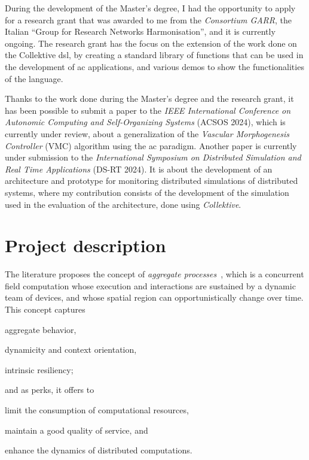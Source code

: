 \documentclass[12pt, a4paper]{article}
\newenvironment{inlinelist}{\begin{enumerate*}[label=\emph{(\roman*)}]}{\end{enumerate*}}
\begin{document}
During the development of the Master's degree,
I had the opportunity to apply for a research grant that was awarded to me from the \emph{Consortium GARR},
the Italian ``Group for Research Networks Harmonisation'',
and it is currently ongoing.
%
The research grant has the focus on the extension of the work done on the Collektive \ac{dsl},
by creating a standard library of functions that can be used in the development of \ac{ac} applications,
and various demos to show the functionalities of the language.

Thanks to the work done during the Master's degree and the research grant,
it has been possible to submit a paper to the \emph{IEEE International Conference on Autonomic Computing and Self-Organizing Systems} (ACSOS 2024),
which is currently under review,
about a generalization of the \emph{Vascular Morphogenesis Controller} (VMC) algorithm using the \ac{ac} paradigm.
%
Another paper is currently under submission to the \emph{International Symposium on Distributed Simulation and Real Time Applications} (DS-RT 2024).
%
It is about the development of an architecture and prototype for monitoring distributed simulations of distributed systems,
where my contribution consists of the development of the simulation used in the evaluation of the architecture,
done using \emph{Collektive}.


\section{Project description}\label{sec:project-description}
The literature proposes the concept of \emph{aggregate processes}~\cite{aggregate-processes},
which is a concurrent field computation whose execution and interactions are sustained by a dynamic team of devices,
and whose spatial region can opportunistically change over time.
%
This concept captures
\begin{inlinelist}
    \item aggregate behavior,
    \item dynamicity and context orientation,
    \item intrinsic resiliency;
\end{inlinelist}
and as perks, it offers to
\begin{inlinelist}
    \item limit the consumption of computational resources,
    \item maintain a good quality of service, and
    \item enhance the dynamics of distributed computations.
\end{inlinelist}
\end{document}
